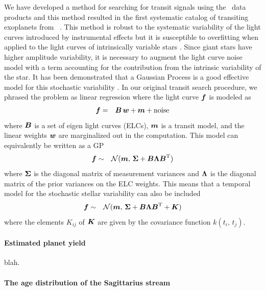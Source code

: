 \documentclass[letterpaper,12pt,preprint]{hack_aastex}
\begin{document}
We have developed a method for searching for transit signals using the \KT\
data products and this method resulted in the first systematic catalog of
transiting exoplanets from \KT\ \citep{Foreman-Mackey:2015}.
This method is robust to the systematic variability of the light curves
introduced by instrumental effects but it is susceptible to overfitting when
applied to the light curves of intrinsically variable stars
\citep{Montet:2015}.
Since giant stars have higher amplitude variability, it is necessary to
augment the light curve noise model with a term accounting for the
contribution from the intrinsic variability of the star.
It has been demonstrated that a Gaussian Process
\citep[GP;][]{Rasmussen:2006, Ambikasaran:2014} is a good effective
model for this stochastic variability \citep{Barclay:2015}.
In our original transit search procedure, we phrased the problem as linear
regression \citep{Foreman-Mackey:2015} where the light curve ${{\boldsymbol{f}}}$ is
modeled as
\begin{eqnarray}
{\ensuremath{{\boldsymbol{f}}}} &=& {{\boldsymbol{B}}}\,{{\boldsymbol{w}}} + {{\boldsymbol{m}}} + \mathrm{noise}
\end{eqnarray}
where ${{\boldsymbol{B}}}$ is a set of eigen light curves (ELCs), ${{\boldsymbol{m}}}$ is a
transit model, and the linear weights ${{\boldsymbol{w}}}$ are marginalized out in the
computation.
This model can equivalently be written as a GP \citep{Rasmussen:2006}
\begin{eqnarray}
{\ensuremath{{\boldsymbol{f}}}} &\sim& \mathcal{N} ({{\boldsymbol{m}}},\,
{{\boldsymbol{\Sigma}}} + {{\boldsymbol{B}}}{{\boldsymbol{\Lambda}}}{{\boldsymbol{B}}}^\mathrm{T})
\end{eqnarray}
where ${{\boldsymbol{\Sigma}}}$ is the diagonal matrix of measurement variances and
${{\boldsymbol{\Lambda}}}$ is the diagonal matrix of the prior variances on the ELC
weights.
This means that a temporal model for the stochastic stellar variability can
also be included
\begin{eqnarray}
{\ensuremath{{\boldsymbol{f}}}} &\sim& \mathcal{N} ({{\boldsymbol{m}}},\,
{{\boldsymbol{\Sigma}}} + {{\boldsymbol{B}}}{{\boldsymbol{\Lambda}}}{{\boldsymbol{B}}}^\mathrm{T} + {{\boldsymbol{K}}})
\end{eqnarray}
where the elements $K_{ij}$ of ${{\boldsymbol{K}}}$ are given by the covariance function
$k(t_i,\,t_j)$.

\paragraph{Estimated planet yield} blah.

\paragraph{The age distribution of the Sagittarius stream}
\end{document}
